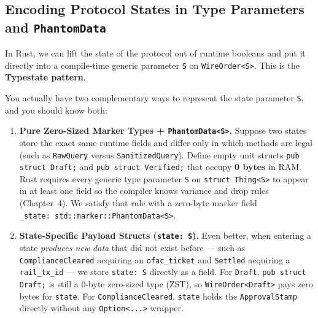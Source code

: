 \subsection{Encoding Protocol States in Type Parameters and \texttt{PhantomData}}

In Rust, we can lift the state of the protocol out of runtime booleans and put it directly into a compile-time generic parameter \texttt{S} on \texttt{WireOrder<S>}. This is the \textbf{Typestate pattern}.

You actually have two complementary ways to represent the state parameter \texttt{S}, and you should know both:

\begin{enumerate}
  \item \textbf{Pure Zero-Sized Marker Types + \texttt{PhantomData<S>}.} Suppose two states store the exact same runtime fields and differ only in which methods are legal (such as \texttt{RawQuery} versus \texttt{SanitizedQuery}). Define empty unit structs \texttt{pub struct Draft;} and \texttt{pub struct Verified;} that occupy \textbf{0 bytes} in RAM. Rust requires every generic type parameter \texttt{S} on \texttt{struct Thing<S>} to appear in at least one field so the compiler knows variance and drop rules (Chapter~4). We satisfy that rule with a zero-byte marker field \texttt{\_state:\allowbreak\ std::marker::\allowbreak{}PhantomData<S>}.
  \item \textbf{State-Specific Payload Structs (\texttt{state: S}).} Even better, when entering a state \emph{produces new data} that did not exist before --- such as \texttt{ComplianceCleared} acquiring an \texttt{ofac\_ticket} and \texttt{Settled} acquiring a \texttt{rail\_tx\_id} --- we store \texttt{state: S} directly as a field. For \texttt{Draft}, \texttt{pub struct Draft;} is still a 0-byte zero-sized type (ZST), so \texttt{WireOrder<Draft>} pays zero bytes for \texttt{state}. For \texttt{ComplianceCleared}, \texttt{state} holds the \texttt{ApprovalStamp} directly without any \texttt{Option<...>} wrapper.
\end{enumerate}

